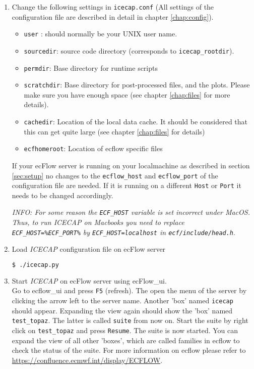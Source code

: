 \documentclass[DIV=10, parskip=full]{scrreprt}
\newcommand{\ice}{\textit{ICECAP}\xspace}
\newcommand{\notimplement}[1]{#1}
\newcommand{\info}[1]{\textit{INFO: #1}}
\begin{document}
\begin{enumerate}
	\item Change the following settings in \texttt{icecap.conf} (All settings of the configuration file are described in detail in chapter \ref{chap:config}). 
	\begin{itemize}
		\item \texttt{user} : should normally be your UNIX user name. 
		\item \texttt{sourcedir}: source code directory (corresponds to \texttt{icecap\_rootdir}).
		\item \texttt{permdir}:  Base directory for runtime scripts 
		\item \texttt{scratchdir}: Base directory for post-processed files, and the plots. Please make sure you have enough space (see chapter \ref{chap:files} for more details). 
		\item \texttt{cachedir}: Location of the local data cache. It should be considered that this can get quite large (see chapter \ref{chap:files} for details)
		\item \texttt{ecfhomeroot}: Location of ecflow specific files
	\end{itemize}
	If your ecFlow server is running on your localmachine as described in section \ref{sec:setup} no changes to the \texttt{ecflow\_host} and  \texttt{ecflow\_port} of the configuration file are needed. If it is running on a different \texttt{Host} or \texttt{Port} it needs to be changed accordingly.
	
	\notimplement{\info{For some reason the \texttt{ECF\_HOST} variable is set incorrect under MacOS. Thus, to run \ice on Macbooks you need to replace \texttt{ECF\_HOST=\%ECF\_PORT\%} by \texttt{ECF\_HOST=localhost} in \texttt{ecf/include/head.h}}}.
	
	\item Load \ice configuration file on ecFlow server\\
	\begin{lstlisting}[language=bash]
		$ ./icecap.py
	\end{lstlisting}
	\item Start \ice on ecFlow server using ecFlow\_ui. \\
	Go to ecflow\_ui and press \texttt{F5} (refresh). The open the menu of the server by clicking the arrow left to the server name. Another 'box' named \texttt{icecap} should appear. Expanding the view again should show the 'box' named \texttt{test\_topaz}. The latter is called \texttt{suite} from now on. Start the suite by  right click on \texttt{test\_topaz} and press \texttt{Resume}. The suite is now started. You can expand the view of all other 'boxes', which are called families in ecflow to check the status of the suite. For more information on ecflow please refer to  \url{https://confluence.ecmwf.int/display/ECFLOW}.
	

\end{enumerate}
\end{document}
